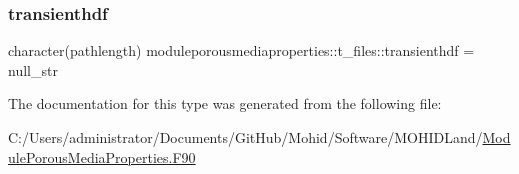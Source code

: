 \mbox{\label{structmoduleporousmediaproperties_1_1t__files_a6e96be3f2802c6bc63056691c395f119}} 
\subsubsection{\texorpdfstring{transienthdf}{transienthdf}}
{\footnotesize\ttfamily character(pathlength) moduleporousmediaproperties\+::t\+\_\+files\+::transienthdf = null\+\_\+str\hspace{0.3cm}{\ttfamily [private]}}



The documentation for this type was generated from the following file\+:\begin{DoxyCompactItemize}
\item 
C\+:/\+Users/administrator/\+Documents/\+Git\+Hub/\+Mohid/\+Software/\+M\+O\+H\+I\+D\+Land/\mbox{\hyperlink{_module_porous_media_properties_8_f90}{Module\+Porous\+Media\+Properties.\+F90}}\end{DoxyCompactItemize}
